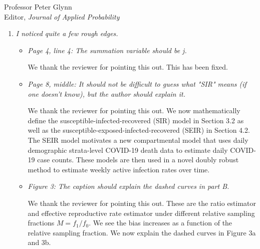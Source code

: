 \documentclass[11pt]{letter} %
\begin{document}
\begin{letter}{Professor
	Peter Glynn\\
	Editor, {\em Journal of Applied Probability}}
\begin{enumerate}
\vspace{5mm}
The original derivations were straightforward and followed from some arithmetic calculations, but the main point was the resulting statistical error decomposition.  While infectious disease researchers and survey statisticians have been aware of the perils of self-selection and measurement error, the interplay in this context has been less well studied.  By extending the statistical decomposition of Meng (2018), we help shed light on how measurement error does not act to simply alter the magnitude of error but may in fact change the sign as well.  This decomposition motivates the new inverse-probability and doubly robust methodologies in the revised manuscript.
\vspace{5mm}

\item {\it I noticed quite a few rough edges.}

\begin{itemize}
\item {\it Page 4, line 4: The summation variable should be j.}

\vspace{5mm}
We thank the reviewer for pointing this out.  This has been fixed.
\vspace{5mm}

\item {\it Page 8, middle: It should not be difficult to guess what "SIR" means (if one doesn't know), but the author should explain it.}

\vspace{5mm}
We thank the reviewer for pointing this out.  We now mathematically define the susceptible-infected-recovered (SIR) model in Section 3.2 as well as the susceptible-exposed-infected-recovered (SEIR) in Section 4.2.  The SEIR model motivates a new compartmental model that uses daily demographic strata-level COVID-19 death data to estimate daily COVID-19 case counts.  These models are then used in a novel doubly robust method to estimate weekly active infection rates over time.
\vspace{5mm}

\item {\it Figure 3: The caption should explain the dashed curves in part B.}

\vspace{5mm}
We thank the reviewer for pointing this out.  These are the ratio estimator and effective reproductive rate estimator under different relative sampling fractions $M = f_1/f_0$. We see the bias increases as a function of the relative sampling fraction.  We now explain the dashed curves in Figure 3a and 3b.
\vspace{5mm}


\end{itemize}
\end{enumerate}
\end{letter}
\end{document}
